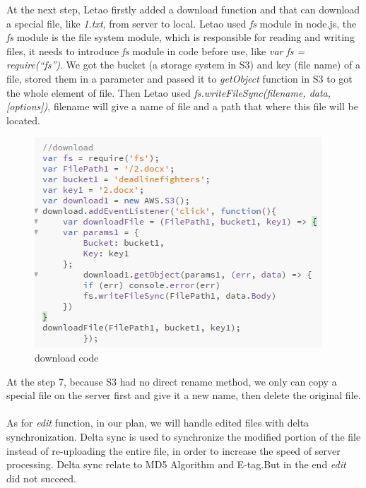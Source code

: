 \documentclass[a4paper]{article}
\begin{document}
{At the next step, Letao firstly added a download function and that can download a special file, like \emph{1.txt}, from server to local. Letao used \emph{fs} module in node.js, the \emph{fs} module is the file system module, which is responsible for reading and writing files, it needs to introduce \emph{fs} module in code before use, like \emph{var fs = require(“fs”)}. We got the bucket (a storage system in S3) and key (file name) of a file, stored them in a parameter and passed it to \emph{getObject} function in S3 to got the whole element of file. Then Letao used \emph{fs.writeFileSync(filename, data, [options])}, filename will give a name of file and a path that where this file will be located.

\begin{figure}[h!]
\centering
\includegraphics[scale=1.3]{code1}
\caption{download code}
\label{fig:code1}
\end{figure}

At the step 7, because S3 had no direct rename method, we only can copy a special file on the server first and give it a new name, then delete the original file.\\\\

As for \emph{edit} function, in our plan, we will handle edited files with delta synchronization. Delta sync is used to synchronize the modified portion of the file instead of re-uploading the entire file, in order to increase the speed of server processing. Delta sync relate to MD5 Algorithm and E-tag.But in the end \emph{edit} did not succeed.\\\\

}
\end{document}
